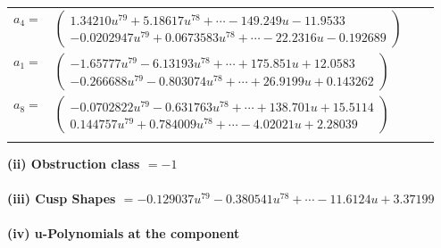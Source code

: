 \documentclass[1p]{elsarticle_modified}
\theoremstyle{definition}
\begin{document}
\begin{tabular}{m{7pt} m{180pt} m{7pt} m{180pt} }
\flushright $a_{4}=$&$\begin{pmatrix}1.34210 u^{79}+5.18617 u^{78}+\cdots-149.249 u-11.9533\\-0.0202947 u^{79}+0.0673583 u^{78}+\cdots-22.2316 u-0.192689\end{pmatrix}$ \\
\flushright $a_{1}=$&$\begin{pmatrix}-1.65777 u^{79}-6.13193 u^{78}+\cdots+175.851 u+12.0583\\-0.266688 u^{79}-0.803074 u^{78}+\cdots+26.9199 u+0.143262\end{pmatrix}$ \\
\flushright $a_{8}=$&$\begin{pmatrix}-0.0702822 u^{79}-0.631763 u^{78}+\cdots+138.701 u+15.5114\\0.144757 u^{79}+0.784009 u^{78}+\cdots-4.02021 u+2.28039\end{pmatrix}$\\&\end{tabular}
\flushleft \textbf{(ii) Obstruction class $= -1$}\\~\\
\flushleft \textbf{(iii) Cusp Shapes $= -0.129037 u^{79}-0.380541 u^{78}+\cdots-11.6124 u+3.37199$}\\~\\
\newpage\renewcommand{\arraystretch}{1}
\flushleft \textbf{(iv) u-Polynomials at the component}\newline \\
\end{document}
